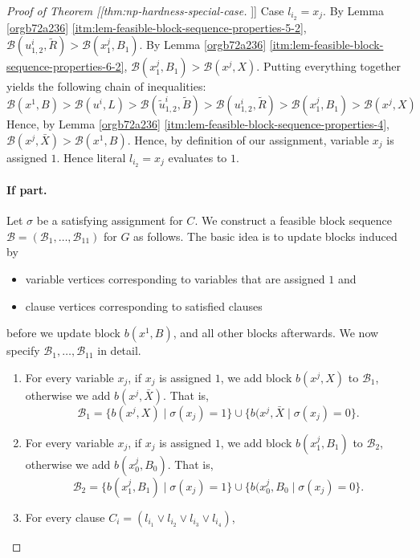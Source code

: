\documentclass[fontsize=11pt,paper=a4]{book}
\begin{document}
\begin{proof}[Proof of Theorem [[thm:np-hardness-special-case]]]
Case \(l_{i_2}=x_j\).
By Lemma \ref{orgb72a236} \ref{itm:lem-feasible-block-sequence-properties-5-2}, \(\mathcal{B}(u_{1,2}^i,\tilde{R})>\mathcal{B}(x_1^j,B_1)\).
By Lemma \ref{orgb72a236} \ref{itm:lem-feasible-block-sequence-properties-6-2}, \(\mathcal{B}(x_1^j,B_1)>\mathcal{B}(x^j,X)\).
Putting everything together yields the following chain of inequalities:
\[
\mathcal{B}(x^1,B)>
\mathcal{B}(u^i,L)>
\mathcal{B}(\tilde{u}_{1,2}^i,\tilde{B})>
\mathcal{B}(u_{1,2}^i,\tilde{R})>
\mathcal{B}(x_1^j,B_1)>
\mathcal{B}(x^j,X)
\]
Hence, by Lemma \ref{orgb72a236} \ref{itm:lem-feasible-block-sequence-properties-4}, \(\mathcal{B}(x^j,\bar{X})>\mathcal{B}(x^1,B)\).
Hence, by definition of our assignment, variable \(x_j\) is assigned \(1\).
Hence literal \(l_{i_2}=x_j\) evaluates to \(1\).

\paragraph{If part.}
Let \(\sigma\) be a satisfying assignment for \(C\).
We construct a feasible block sequence \(\mathcal{B}=(\mathscr{B}_1,\dots,\mathscr{B}_{11})\) for \(G\) as follows.
The basic idea is to update blocks induced by

\begin{itemize}
\item variable vertices corresponding to variables that are assigned \(1\) and

\item clause vertices corresponding to satisfied clauses
\end{itemize}


before we update block \(b(x^1,B)\), and all other blocks afterwards.
We now specify \(\mathscr{B}_1,\dots,\mathscr{B}_{11}\) in detail.

\begin{enumerate}
\item For every variable \(x_j\), if \(x_j\) is assigned \(1\), we add block \(b(x^j,X)\) to \(\mathscr{B}_1\), otherwise we add \(b(x^j,\bar{X})\).
That is,
\[
   \mathscr{B}_1=\{b(x^j,X)\mid\sigma(x_j)=1\}\cup\{b(x^j,\bar{X}\mid\sigma(x_j)=0\}.
   \]

\item For every variable \(x_j\), if \(x_j\) is assigned \(1\), we add block \(b(x_1^j,B_1)\) to \(\mathscr{B}_2\), otherwise we add \(b(x_0^j,B_0)\).
That is,
\[
   \mathscr{B}_2=\{b(x_1^j,B_1)\mid\sigma(x_j)=1\}\cup\{b(x_0^j,B_0\mid\sigma(x_j)=0\}.
   \]

\item For every clause \(C_i=(l_{i_1}\vee l_{i_2}\vee l_{i_3}\vee l_{i_4})\),


\end{enumerate}
\end{proof}
\end{document}

